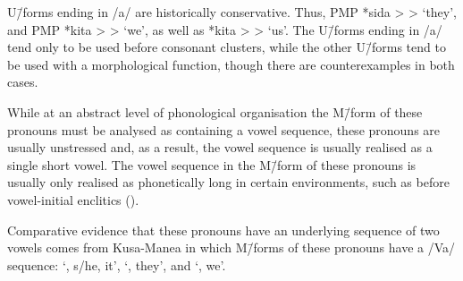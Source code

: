 \begin{exe}
	\label{ex:LexDel}
	\gw{}
\end{exe}

U\=/forms ending in /a/ are historically conservative.
Thus, PMP *sida >  >  `they',
and PMP *kita >  >  `we',
as well as *kita >  >  `us'.
The U\=/forms ending in /a/ tend only to
be used before consonant clusters, while the other
U\=/forms tend to be used with a morphological function,
though there are counterexamples in both cases.

While at an abstract level of phonological
organisation the M\=/form of these pronouns
must be analysed as containing a vowel sequence,
these pronouns are usually unstressed and, as a result, the vowel
sequence is usually realised as a single short vowel.
The vowel sequence in the M\=/form of these pronouns
is usually only realised as phonetically long in certain environments,
such as before vowel-initial enclitics ().

Comparative evidence that these pronouns
have an underlying sequence of two vowels comes from Kusa-Manea
in which M\=/forms of these pronouns have a /Va/ sequence:
 `{\iin}, s/he, it',  `{\siin}, they',
and  `, we'.


